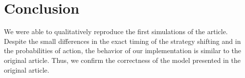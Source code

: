 \documentclass[10pt,a4paper,onecolumn]{article}
\begin{document}
\section{Conclusion}\label{conclusion}

We were able to qualitatively reproduce the first simulations of the
article. Despite the small differences in the exact timing of the
strategy shifting and in the probabilities of action, the behavior of
our implementation is similar to the original article. Thus, we confirm
the correctness of the model presented in the original article.

{\sffamily \small
  \printbibliography[title=References]
}
\end{document}
